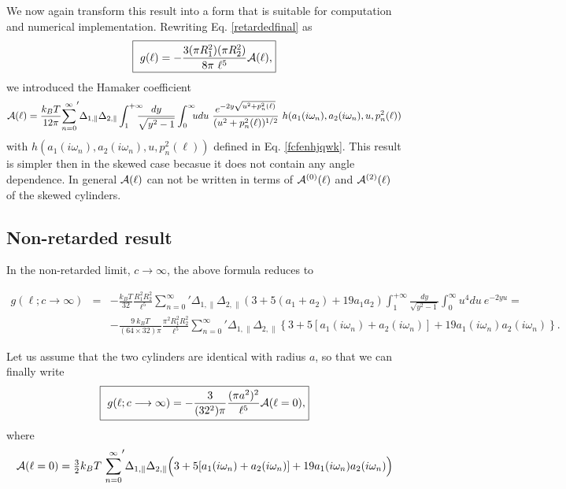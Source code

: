 \documentclass[onecolumn,letterpaper,amsmath,amssymb,floatfix,aps,superscriptaddress]{revtex4}
\begin{document}
We now again transform this result into a form that is suitable for computation and numerical implementation. Rewriting Eq. \ref{retardedfinal} as
\begin{equation}
  \fbox{
    $\displaystyle{
g(\ell) = - \frac{3 (\pi R_1^{2}) (\pi R_2^{2})}{8\pi~\ell^5} {\cal A}(\ell),}$}
\label{retardedfinal-a}
\end{equation}
we introduced the Hamaker coefficient
\begin{equation}
{\cal A}(\ell) = \frac{k_BT}{12 \pi} {\sum_{n=0}^{\infty}}' \Delta_{1,\parallel} \Delta_{2,\parallel} 
\int_{1}^{+\infty}\!\!\!\!\! \frac{dy}{\sqrt{y^2 - 1}} \int_0^{\infty}\!\!\!  u du ~\frac{e^{-2 y \sqrt{u^{2} + p_n^{2}(\ell)}}}{(u^{2} +p_n^{2}(\ell))^{1/2}} ~h(a_1(i \omega_n), a_2(i \omega_n), u, p_n^{2}(\ell))
\label{retardedfinal-b}
\end{equation}
with $h(a_1(i \omega_n), a_2(i \omega_n), u, p_n^{2}(\ell))$ defined in Eq. \ref{fcfenhjqwk}. This result is simpler then in the skewed case becasue it does not contain any angle dependence. In general ${\cal A}(\ell)$ can not be written in terms of ${\cal A}^{(0)}(\ell)$ and ${\cal A}^{(2)}(\ell)$ of the skewed cylinders.


\subsection{Non-retarded result}


In the non-retarded limit, $c \longrightarrow \infty$, the above formula  reduces to 
\begin{widetext}
\begin{eqnarray}
g(\ell; c \longrightarrow \infty) &=& - \frac{k_BT}{32} \frac{ R_1^{2} R_2^{2} }{\ell^5} {\sum_{n=0}^{\infty}}' \Delta_{1,\parallel} \Delta_{2,\parallel} 
\left( 3 + 5 (a_1+a_2) + 19 a_1 a_2 \right) \int_{1}^{+\infty}\!\!\!\!\! \frac{dy}{\sqrt{y^2 - 1}} \int_0^{\infty}\!\!\! u^4 du ~{e^{-2 y u }} = \nonumber\\
& & - \frac{9 ~k_BT}{(64 \times 32) \pi } \frac{\pi^2 R_1^{2} R_2^{2}}{\ell^5} {\sum_{n=0}^{\infty}}' \Delta_{1,\parallel} \Delta_{2,\parallel}
\left \{ 3 + 5 [ a_1(i \omega_n) + a_2(i \omega_n) ] + 19 a_1(i \omega_n) a_2(i \omega_n) \right \}.
\label{eq:cyl-paral-nonretarded}
\end{eqnarray}
\end{widetext}
Let us assume that the two cylinders are identical with radius $a$, so that we can finally write
\begin{equation}
  \fbox{
    $\displaystyle{
g(\ell; c \longrightarrow \infty) = - \frac{3}{(32^2) \pi } \frac{(\pi a^2)^{2}}{\ell^5} {\cal A}(\ell = 0),
\label{eq:cyl-paral-nonretarded-frq3}}$}
\end{equation}
where
\begin{equation}
{\cal A}(\ell = 0) = {\textstyle\frac32} {k_BT} ~ {\sum_{n=0}^{\infty}}' \Delta_{1,\parallel} \Delta_{2,\parallel}
\Big( 3 + 5 [ a_1(i \omega_n) + a_2(i \omega_n) ] + 19 a_1(i \omega_n) a_2(i \omega_n) \Big)
\label{eq:cyl-paral-nonretarded-frq3_A}
\end{equation}
\end{document}
